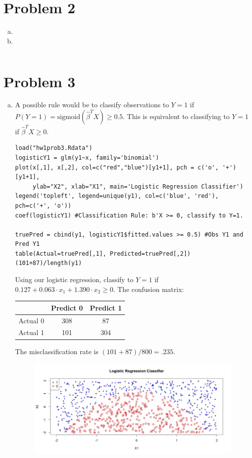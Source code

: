 \documentclass[12pt]{article}
\begin{document}
\section*{Problem 2}
\begin{enumerate}[(a)]
\item 
\item 
\end{enumerate}

\begin{lstlisting}
\end{lstlisting}

\section*{Problem 3}
\begin{enumerate}[(a)]
\item A possible rule would be to classify observations to $Y=1$ if $P(Y=1) = \text{sigmoid}(\hat{\beta}^T X) \geq 0.5$. This is equivalent to classifying to $Y=1$ if $\hat{\beta}^T X \geq 0$. 
\begin{lstlisting}
load("hw1prob3.Rdata")
logisticY1 = glm(y1~x, family='binomial')
plot(x[,1], x[,2], col=c("red","blue")[y1+1], pch = c('o', '+')[y1+1], 
     ylab="X2", xlab="X1", main='Logistic Regression Classifier')
legend('topleft', legend=unique(y1), col=c('blue', 'red'), pch=c('+', 'o'))
coef(logisticY1) #Classification Rule: b'X >= 0, classify to Y=1.

truePred = cbind(y1, logisticY1$fitted.values >= 0.5) #Obs Y1 and Pred Y1
table(Actual=truePred[,1], Predicted=truePred[,2])
(101+87)/length(y1)
\end{lstlisting}
Using our logistic regression, classify to $Y=1$ if $0.127 + 0.063 \cdot x_1 + 1.390 \cdot x_2 \geq 0$. The confusion matrix:
\begin{table}[H] \center
\begin{tabular}{ccc} \hline
& Predict 0 & Predict 1 \\ \hline
Actual 0 & 308 &  87 \\ 
Actual 1 & 101 & 304 \\ \hline
\end{tabular}
\end{table}
The misclassification rate is $ (101+87) / 800 = .235$.
\begin{figure}[H] \center
\includegraphics[scale=.4]{y1_plot.jpeg}
\end{figure}


\end{enumerate}
\end{document}
